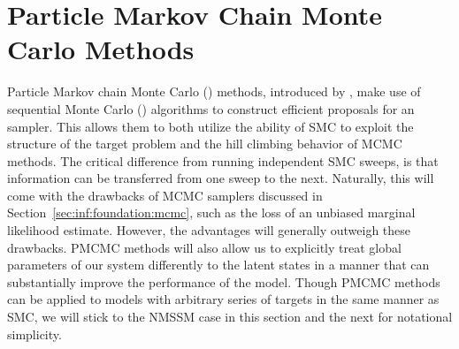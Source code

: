 
\section{Particle Markov Chain Monte Carlo Methods}
\label{sec:part:pmcmc}

Particle Markov chain Monte Carlo (\pmcmc) methods, introduced by \citet{andrieu2010particle}, make use of 
sequential Monte Carlo (\smc) algorithms \citep{gordon1993novel,doucet2001sequential} to construct 
efficient proposals for an \mcmc sampler. This allows them to both utilize the ability of SMC to
exploit the structure of the target problem and the hill climbing behavior of MCMC methods.
The critical difference from running independent SMC sweeps, is that information can be transferred
from one sweep to the next. 
Naturally, this will come with the drawbacks of MCMC samplers
discussed in Section~\ref{sec:inf:foundation:mcmc}, such as the loss of an unbiased marginal likelihood estimate.
However, the advantages will generally outweigh these drawbacks.  PMCMC methods will also allow us to explicitly
treat global parameters of our system differently to the latent states in a manner that can substantially improve
the performance of the model.
Though PMCMC methods can be applied to models with arbitrary series of targets in the same manner as SMC, we will stick
to the NMSSM case in this section and the next for notational simplicity.

